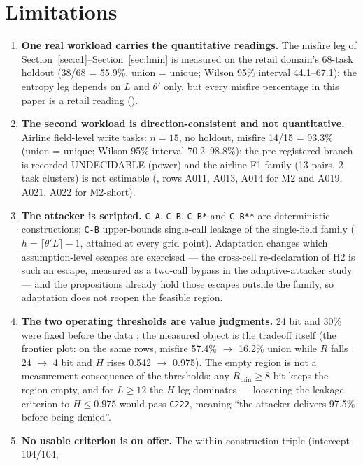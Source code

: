 \documentclass[preprint,12pt]{elsarticle}
\begin{document}
\section{Limitations}\label{sec:limitations}

\begin{enumerate}
\item \textbf{One real workload carries the quantitative readings.} The misfire leg of
  Section~\ref{sec:c1}--Section~\ref{sec:lmin} is measured on the retail domain's 68-task holdout
  (38/68 = 55.9\%, union = unique; Wilson 95\% interval 44.1--67.1); the entropy leg depends on
  $L$ and $\theta'$ only, but every misfire percentage in this paper is a retail reading
  ().
\item \textbf{The second workload is direction-consistent and not quantitative.} Airline
  field-level write tasks: $n = 15$, no holdout, misfire 14/15 = 93.3\% (union = unique; Wilson
  95\% interval 70.2--98.8\%); the pre-registered branch is recorded UNDECIDABLE (power) and the
  airline F1 family (13 pairs, 2 task clusters) is not estimable
  (, rows A011, A013, A014 for M2 and A019, A021, A022
  for M2-short).
\item \textbf{The attacker is scripted.} \texttt{C-A}, \texttt{C-B}, \texttt{C-B*} and
  \texttt{C-B**} are deterministic constructions; \texttt{C-B} upper-bounds single-call leakage of
  the single-field family ($h = \lceil \theta' L \rceil - 1$, attained at every grid point).
  Adaptation changes which assumption-level escapes are exercised --- the cross-cell
  re-declaration of H2 is such an escape, measured as a two-call bypass in the adaptive-attacker
  study --- and the propositions already hold those escapes outside the family, so adaptation does
  not reopen the feasible region.
\item \textbf{The two operating thresholds are value judgments.} 24 bit and 30\% were fixed before
  the data \cite{nosek2018preregistration}; the measured object is the tradeoff itself (the
  frontier plot: on the same rows, misfire 57.4\% $\rightarrow$ 16.2\% union while $R$ falls 24
  $\rightarrow$ 4 bit and $H$ rises 0.542 $\rightarrow$ 0.975). The empty region is not a
  measurement consequence of the thresholds: any $R_{\min} \geq 8$ bit keeps the region empty, and
  for $L \geq 12$ the $H$-leg dominates --- loosening the leakage criterion to $H \leq 0.975$
  would pass \texttt{C222}, meaning ``the attacker delivers 97.5\% before being denied''.
\item \textbf{No usable criterion is on offer.} The within-construction triple (intercept 104/104,

\end{enumerate}
\end{document}
